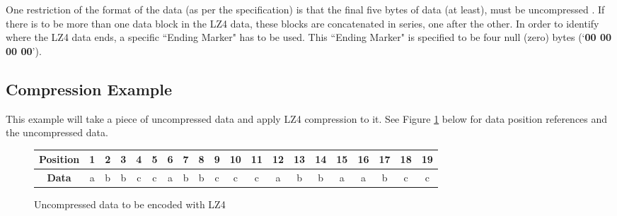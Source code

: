 \documentclass[12pt]{article}
\begin{document}
One restriction of the format of the data (as per the specification) is that the final five bytes of data (at least), must be uncompressed \citep{lz4_github}.
If there is to be more than one data block in the LZ4 data, these blocks are concatenated in series, one after the other. In order to identify where the LZ4 data ends, a specific ``Ending Marker" has to be used. This ``Ending Marker" is specified to be four null (zero) bytes (`\textbf{00 00 00 00}').


\subsection{Compression Example}{\label{sec_lz4_compress}}
This example will take a piece of uncompressed data and apply LZ4 compression to it. See Figure \ref{uncompressed_lz4} below for data position references and the uncompressed data.

\begin{figure}[H]
	\centering
	\setlength\tabcolsep{3pt} %
	\begin{tabular}{|c|c|c|c|c|c|c|c|c|c|c|c|c|c|c|c|c|c|c|c|} 
		\hline
		\textbf{Position} & 1 & 2 & 3 & 4 & 5 & 6 & 7 & 8 & 9 & 10 & 11 & 12 & 13 & 14 & 15 & 16 & 17 & 18 & 19\\
		\hline
		\textbf{Data} & a & b & b & c & c & a & b & b & c & c & c & a & b & b & a & a & b & c & c\\
		\hline
	\end{tabular}
	\caption{Uncompressed data to be encoded with LZ4}
	\label{uncompressed_lz4}
\end{figure}
\end{document}
